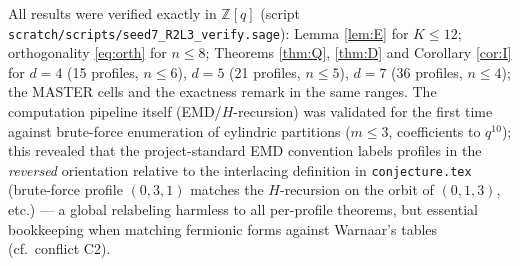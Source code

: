 \documentclass[11pt]{article}
\newcommand{\ZZ}{\mathbb{Z}}
\begin{document}
All results were verified exactly in $\ZZ[q]$ (script
\texttt{scratch/scripts/seed7\_R2L3\_verify.sage}): Lemma \ref{lem:E} for $K\le12$;
orthogonality \eqref{eq:orth} for $n\le8$; Theorems \ref{thm:Q}, \ref{thm:D} and
Corollary \ref{cor:I} for $d=4$ (15 profiles, $n\le6$), $d=5$ (21 profiles, $n\le5$),
$d=7$ (36 profiles, $n\le4$); the MASTER cells and the exactness remark in the same
ranges. The computation pipeline itself (EMD/$H$-recursion) was validated for the first
time against brute-force enumeration of cylindric partitions ($m\le3$, coefficients to
$q^{10}$); this revealed that the project-standard EMD convention labels profiles in the
\emph{reversed} orientation relative to the interlacing definition in
\texttt{conjecture.tex} (brute-force profile $(0,3,1)$ matches the $H$-recursion on the
orbit of $(0,1,3)$, etc.) --- a global relabeling harmless to all per-profile theorems,
but essential bookkeeping when matching fermionic forms against Warnaar's tables
(cf.\ conflict C2).
\end{document}
